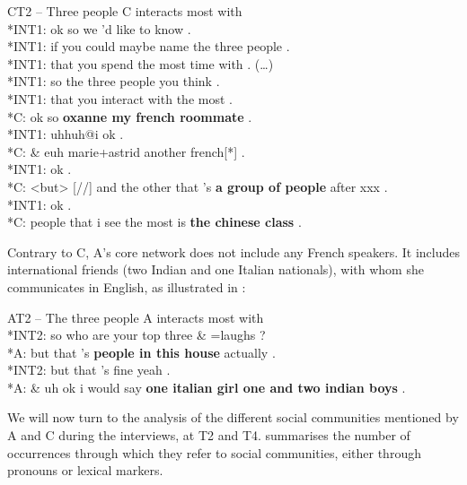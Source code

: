 \documentclass[output=paper]{langscibook}
\begin{document}
\newpage
\ea%
    \label{ex:10}
    CT2 – Three people C interacts most with\medskip\\
*INT1: \tab ok so we 'd like to know .\\
*INT1: \tab if you could maybe name the three people .\\
*INT1: \tab that you spend the most time with . (…)\\
*INT1: \tab so the three people you think .\\
*INT1: \tab that you interact with the most .\\
*C: \tab ok so \textbf{oxanne my french roommate} .\\
*INT1: \tab uhhuh@i ok .\\
*C: \tab \& euh marie+astrid another french[*] .\\
*INT1: \tab ok .\\
*C: \tab <but> [//] and the other that 's \textbf{a group of people} after xxx .\\
*INT1: \tab ok .\\
*C: \tab people that i see the most is \textbf{the chinese class} . \\
\z

Contrary to C, A’s core network does not include any French speakers. It includes international friends (two Indian and one Italian nationals), with whom she communicates in English, as illustrated in :

\ea%
    \label{ex:11}
    AT2 – The three people A interacts most with\medskip\\
*INT2: \tab so who are your top three \& =laughs ?\\
*A: \tab but that 's \textbf{people in this house} actually .\\
*INT2: \tab but that 's fine yeah .\\
*A: \tab \& uh ok i would say \textbf{one italian girl one and two indian boys} .\\
\z

We will now turn to the analysis of the different social communities mentioned by A and C during the interviews, at T2 and T4.  summarises the number of occurrences through which they refer to social communities, either through pronouns or lexical markers.
\end{document}
